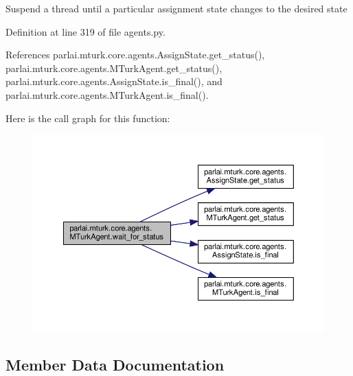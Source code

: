 \begin{DoxyVerb}Suspend a thread until a particular assignment state changes
to the desired state
\end{DoxyVerb}
 

Definition at line 319 of file agents.\+py.



References parlai.\+mturk.\+core.\+agents.\+Assign\+State.\+get\+\_\+status(), parlai.\+mturk.\+core.\+agents.\+M\+Turk\+Agent.\+get\+\_\+status(), parlai.\+mturk.\+core.\+agents.\+Assign\+State.\+is\+\_\+final(), and parlai.\+mturk.\+core.\+agents.\+M\+Turk\+Agent.\+is\+\_\+final().

Here is the call graph for this function\+:
\nopagebreak
\begin{figure}[H]
\begin{center}
\leavevmode
\includegraphics[width=350pt]{classparlai_1_1mturk_1_1core_1_1agents_1_1MTurkAgent_af1a00c6edfe78ac978c5bf97e88bdbe4_cgraph}
\end{center}
\end{figure}


\subsection{Member Data Documentation}
\mbox{\label{classparlai_1_1mturk_1_1core_1_1agents_1_1MTurkAgent_a97121ee3185b8a5e16da522d115035ca}} 
